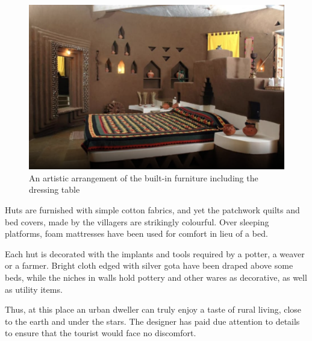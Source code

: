 \begin{figure}[H]
  \centering
  \includegraphics[angle=0,width=1.0\textwidth]{img/dc-07}
  \caption{An artistic arrangement of the built-in furniture including the dressing table}
  \label{fig:dc-07} 
\end{figure}

\noindent Huts are furnished with simple cotton fabrics, and yet the patchwork quilts and bed covers, made by the villagers are strikingly colourful. Over sleeping platforms, foam mattresses have been used for comfort in lieu of a bed.

Each hut is decorated with the implants and tools required by a potter, a weaver or a farmer. Bright cloth edged with silver gota have been draped above some beds, while the niches in walls hold pottery and other wares as decorative, as well as utility items.

Thus, at this place an urban dweller can truly enjoy a taste of rural living, close to the earth and under the stars. The designer has paid due attention to details to ensure that the tourist would face no discomfort.


